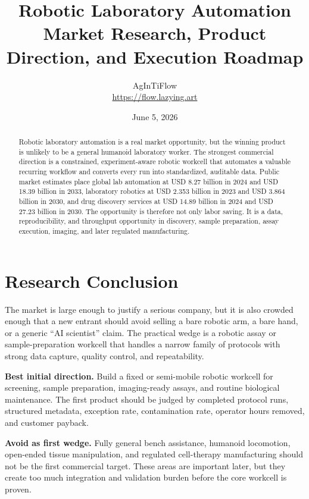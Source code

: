 \documentclass[11pt]{article}
\title{\vspace{-1.35cm}\textbf{Robotic Laboratory Automation}\\
\large Market Research, Product Direction, and Execution Roadmap}
\author{AgInTiFlow\\\url{https://flow.lazying.art}}
\date{June 5, 2026}
\begin{document}
\maketitle
\vspace{-0.8em}

\begin{abstract}
Robotic laboratory automation is a real market opportunity, but the winning product is unlikely to be a general humanoid laboratory worker. The strongest commercial direction is a constrained, experiment-aware robotic workcell that automates a valuable recurring workflow and converts every run into standardized, auditable data. Public market estimates place global lab automation at USD 8.27 billion in 2024 and USD 18.39 billion in 2033, laboratory robotics at USD 2.353 billion in 2023 and USD 3.864 billion in 2030, and drug discovery services at USD 14.89 billion in 2024 and USD 27.23 billion in 2030. The opportunity is therefore not only labor saving. It is a data, reproducibility, and throughput opportunity in discovery, sample preparation, assay execution, imaging, and later regulated manufacturing.
\end{abstract}

\section{Research Conclusion}

The market is large enough to justify a serious company, but it is also crowded enough that a new entrant should avoid selling a bare robotic arm, a bare hand, or a generic ``AI scientist'' claim. The practical wedge is a robotic assay or sample-preparation workcell that handles a narrow family of protocols with strong data capture, quality control, and repeatability.

\textbf{Best initial direction.} Build a fixed or semi-mobile robotic workcell for screening, sample preparation, imaging-ready assays, and routine biological maintenance. The first product should be judged by completed protocol runs, structured metadata, exception rate, contamination rate, operator hours removed, and customer payback.

\textbf{Avoid as first wedge.} Fully general bench assistance, humanoid locomotion, open-ended tissue manipulation, and regulated cell-therapy manufacturing should not be the first commercial target. These areas are important later, but they create too much integration and validation burden before the core workcell is proven.
\end{document}
